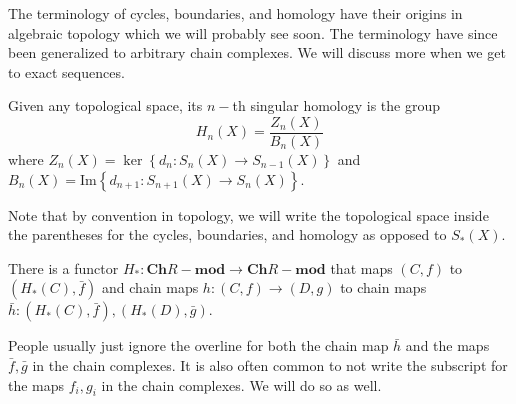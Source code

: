 \documentclass[12pt,reqno]{amsart}
\numberwithin{theorem}{section}
\theoremstyle{definition}
\theoremstyle{remark}
\numberwithin{equation}{section}
\newcommand{\set}[1]{\left \{ #1 \right \}}
\renewcommand{\Im}{\text{Im}}
\theoremstyle{definition}
\begin{document}
The terminology of cycles, boundaries, and homology have their origins in algebraic topology which we will probably see soon. The terminology have since been generalized to arbitrary chain complexes. We will discuss more when we get to exact sequences.
\begin{definition}
    Given any topological space, its $n-$th singular homology is the group
    $$H_n(X) = \frac{Z_n(X) }{B_n(X)}$$
    where $Z_n(X) = \ker \set{d_n:S_n(X)\rightarrow S_{n-1}(X)}$ and $B_n(X) = \Im\set{d_{n+1}:S_{n+1}(X)\rightarrow S_n(X)}$.
\end{definition}
Note that by convention in topology, we will write the topological space inside the parentheses for the cycles, boundaries, and homology as opposed to $S_*(X)$.
\begin{proposition}
    There is a functor $H_*:\mathbf{Ch}R-\mathbf{mod} \rightarrow \mathbf{Ch}R-\mathbf{mod} $ that maps $(C,f)$ to $(H_*(C),\bar f)$ and chain maps $h:(C,f)\rightarrow (D,g)$ to chain maps $\bar h:(H_*(C),\bar f),(H_*(D),\bar g)$.
\end{proposition}
People usually just ignore the overline for both the chain map $\bar h$ and the maps $\bar f,\bar g$ in the chain complexes. It is also often common to not write the subscript for the maps $f_i,g_i$ in the chain complexes. We will do so as well.
\end{document}
